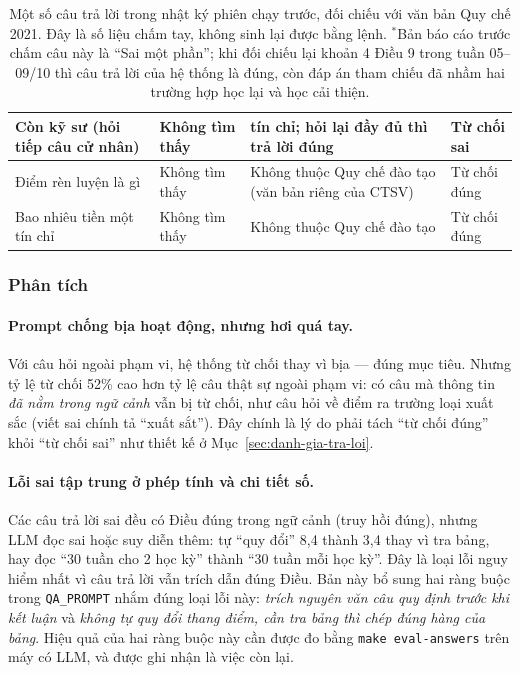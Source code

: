 \begin{table}[H]
\begin{tabularx}{\textwidth}{>{\hsize=0.95\hsize}X >{\hsize=0.95\hsize}X >{\hsize=1.1\hsize}X l}
    Còn kỹ sư (hỏi tiếp câu cử nhân) & Không tìm thấy & 150 tín chỉ; hỏi lại đầy đủ thì trả lời đúng & Từ chối sai \\
    \midrule
    Điểm rèn luyện là gì & Không tìm thấy & Không thuộc Quy chế đào tạo (văn bản riêng của CTSV) & Từ chối đúng \\
    Bao nhiêu tiền một tín chỉ & Không tìm thấy & Không thuộc Quy chế đào tạo & Từ chối đúng \\
    \bottomrule
  \end{tabularx}
  \caption{Một số câu trả lời trong nhật ký phiên chạy trước, đối chiếu với văn bản Quy chế 2021.
  Đây là số liệu chấm tay, không sinh lại được bằng lệnh. $^{*}$Bản báo cáo trước chấm câu này là
  ``Sai một phần''; khi đối chiếu lại khoản 4 Điều 9 trong tuần 05--09/10 thì câu trả lời của hệ thống
  là đúng, còn đáp án tham chiếu đã nhầm hai trường hợp học lại và học cải thiện.}
  \label{tab:tra-loi}
\end{table}

\subsubsection{Phân tích}

\paragraph{Prompt chống bịa hoạt động, nhưng hơi quá tay.} Với câu hỏi ngoài phạm vi, hệ thống từ chối
thay vì bịa --- đúng mục tiêu. Nhưng tỷ lệ từ chối 52\% cao hơn tỷ lệ câu thật sự ngoài phạm vi: có
câu mà thông tin \emph{đã nằm trong ngữ cảnh} vẫn bị từ chối, như câu hỏi về điểm ra trường loại xuất
sắc (viết sai chính tả ``xuất sắt''). Đây chính là lý do phải tách ``từ chối đúng'' khỏi ``từ chối
sai'' như thiết kế ở Mục~\ref{sec:danh-gia-tra-loi}.

\paragraph{Lỗi sai tập trung ở phép tính và chi tiết số.} Các câu trả lời sai đều có Điều đúng trong
ngữ cảnh (truy hồi đúng), nhưng LLM đọc sai hoặc suy diễn thêm: tự ``quy đổi'' 8,4 thành 3,4 thay vì
tra bảng, hay đọc ``30 tuần cho 2 học kỳ'' thành ``30 tuần mỗi học kỳ''. Đây là loại lỗi nguy hiểm nhất vì câu
trả lời vẫn trích dẫn đúng Điều. Bản này bổ sung hai ràng buộc trong \texttt{QA\_PROMPT} nhắm đúng
loại lỗi này: \emph{trích nguyên văn câu quy định trước khi kết luận} và \emph{không tự quy đổi thang
điểm, cần tra bảng thì chép đúng hàng của bảng}. Hiệu quả của hai ràng buộc này cần được đo bằng
\texttt{make eval-answers} trên máy có LLM, và được ghi nhận là việc còn lại.

